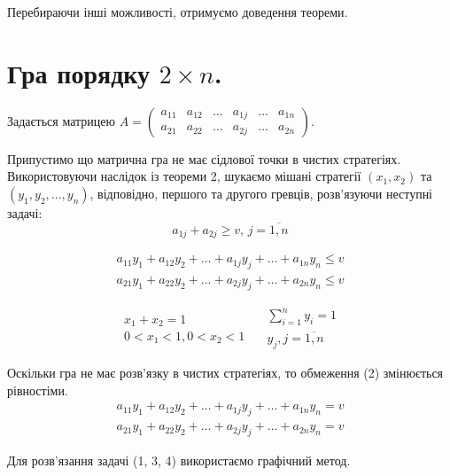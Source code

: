 \documentclass[12pt,a4paper]{report}
\begin{document}
Перебираючи інші можливості, отримуємо доведення теореми.

\clearpage

\chapter{Гра порядку $2 \times n$.}
Задається матрицею $A=\left ( \begin{array}{cccccc}
a_{11}&a_{12}&\dots&a_{1j}&\dots&a_{1n}\\
a_{21}&a_{22}&\dots&a_{2j}&\dots&a_{2n}
\end{array}\right)$.

Припустимо що матрична гра не має сідлової точки в чистих стратегіях. Використовуючи наслідок із теореми 2, шукаємо мішані стратегії $(x_1, x_2)$ та $(y_1,y_2,\dots,y_n)$, відповідно, першого та другого гревців, розв'язуючи неступні задачі:
\begin{equation}
a_{1j}+a_{2j} \ge v, \, j=\overline{1,n}
\end{equation}

\begin{equation}
\begin{array}{l}
a_{11}y_1+a_{12}y_2+\dots+a_{1j}y_j+\dots+a_{1n}y_n \le v\\
a_{21}y_1+a_{22}y_2+\dots+a_{2j}y_j+\dots+a_{2n}y_n \le v
\end{array}
\end{equation}

\begin{equation}
\begin{array}{c}
x_1+x_2=1\\
0<x_1<1, 0<x_2<1
\end{array}
\quad
\begin{array}{c}
\sum_{i=1}^n y_i=1\\
y_j, j=\overline{1,n}
\end{array}
\end{equation}

Оскільки гра не має розв'язку в чистих стратегіях, то обмеження (2) змінюється рівностіми.
\begin{equation}
\begin{array}{l}
a_{11}y_1+a_{12}y_2+\dots+a_{1j}y_j+\dots+a_{1n}y_n = v\\
a_{21}y_1+a_{22}y_2+\dots+a_{2j}y_j+\dots+a_{2n}y_n = v
\end{array}
\end{equation}

Для розв'язання задачі (1, 3, 4) використаємо графічний метод.
\end{document}
